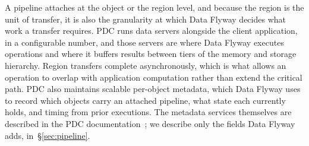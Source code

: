 A pipeline attaches at the object or the region level, and because the region is the unit of transfer, it is also the granularity at which Data Flyway decides what work a transfer requires. PDC runs data servers alongside the client application, in a configurable number, and those servers are where Data Flyway executes operations and where it buffers results between tiers of the memory and storage hierarchy. Region transfers complete asynchronously, which is what allows an operation to overlap with application computation rather than extend the critical path. PDC also maintains scalable per-object metadata, which Data Flyway uses to record which objects carry an attached pipeline, what state each currently holds, and timing from prior executions. The metadata services themselves are described in the PDC documentation~\cite{pdcdocs}; we describe only the fields Data Flyway adds, in~\S\ref{sec:pipeline}.

